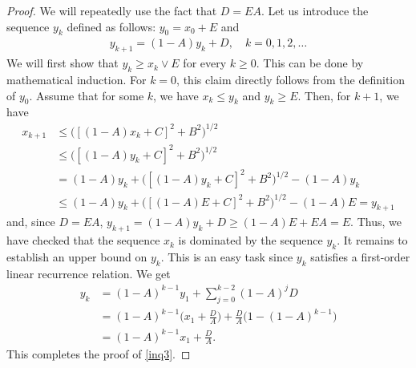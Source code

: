 \documentclass[aoap,preprint,reqno,a4paper]{imsart} %
\begin{document}
\begin{proof} We will repeatedly use the fact that $D = EA$.
Let us introduce the sequence $y_k$ defined as follows: $y_0 = x_0 + E$
and
\begin{align}
y_{k+1} = (1-A) y_k + D, \quad k=0,1,2,\ldots
\end{align}
We will first show that $y_k\ge x_k\vee E$ for every $k\ge 0$. This can be done by
mathematical induction. For $k=0$, this claim directly follows from the definition of $y_0$.
Assume that for some $k$, we have $x_k\le y_k$ and $y_k\ge E$. Then, for $k+1$, we
have
\begin{align}
x_{k+1}
		&\le \big([(1-A)x_k+C]^2+B^2\big)^{1/2} \\
		&\le \big([(1-A)y_k+C]^2+B^2\big)^{1/2} \\
		& = (1-A)y_k + \big([(1-A)y_k+C]^2+B^2\big)^{1/2} - (1-A)y_k\\
		&\le (1-A)y_k + \big([(1-A)E+C]^2+B^2\big)^{1/2} - (1-A)E
		 = y_{k+1}
\end{align}
and, since $D= EA$, $y_{k+1} = (1-A) y_k + D \ge (1-A)E  +  EA = E$.
Thus, we have checked that the sequence $x_k$ is dominated by the sequence $y_k$. It remains to
establish an upper bound on $y_k$. This is an easy task since $y_k$ satisfies a first-order
linear recurrence relation. We get
\begin{align}
y_{k} &= (1-A)^{k-1} y_1 + \sum_{j=0}^{k-2}(1-A)^j D\\
			&= (1-A)^{k-1} \Big(x_1 +\frac{D}{A}\Big) + \frac{D}{A}\big(1-(1-A)^{k-1}\big)\\
			&= (1-A)^{k-1} x_1 +\frac{D}{A}.
\end{align}
This completes the proof of \eqref{inq3}.
\end{proof}
\end{document}
